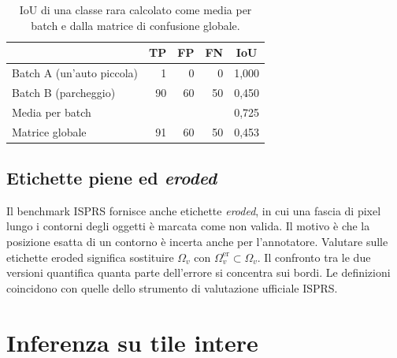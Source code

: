 \begin{table}[t]
  \centering
  \small
  \caption[Media per batch e matrice di confusione globale]{IoU di una classe rara calcolato
    come media per batch e dalla matrice di confusione globale.}
  \label{tab:media-batch}
  \begin{tabular}{|l|r|r|r|c|}
    \hline
    & \textbf{TP} & \textbf{FP} & \textbf{FN} & \textbf{IoU} \\
    \hline
    Batch A (un'auto piccola) & 1 & 0 & 0 & 1,000 \\
    Batch B (parcheggio) & 90 & 60 & 50 & 0,450 \\
    \hline
    Media per batch & & & & 0,725 \\
    \rowcolor{RigaRiferimento}
    Matrice globale & 91 & 60 & 50 & 0,453 \\
    \hline
  \end{tabular}
\end{table}

\subsection{Etichette piene ed \emph{eroded}}

Il benchmark ISPRS fornisce anche etichette \emph{eroded}, in cui una fascia di pixel lungo i
contorni degli oggetti è marcata come non valida. Il motivo è che la posizione esatta di un
contorno è incerta anche per l'annotatore. Valutare sulle etichette eroded significa sostituire
$\Omega_v$ con $\Omega_v^{\mathrm{er}}\subset\Omega_v$. Il confronto tra le due versioni
quantifica quanta parte dell'errore si concentra sui bordi. Le definizioni coincidono con quelle
dello strumento di valutazione ufficiale ISPRS.

\section{Inferenza su tile intere}
\label{sec:finestra}


